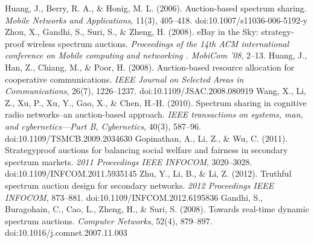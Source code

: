 \begin{thebibliography}{1}
 Huang, J., Berry, R. A., \& Honig, M. L. (2006). Auction-based spectrum sharing. \textit{Mobile Networks and Applications}, 11(3), 405–418. doi:10.1007/s11036-006-5192-y
 Zhou, X., Gandhi, S., Suri, S., \& Zheng, H. (2008). eBay in the Sky: strategy-proof wireless spectrum auctions. \textit{Proceedings of the 14th ACM international conference on Mobile computing and networking . MobiCom  ’08}, 2–13.  
 Huang, J., Han, Z., Chiang, M., \& Poor, H. (2008). Auction-based resource allocation for cooperative communications. \textit{IEEE Journal on Selected Areas in Communications}, 26(7), 1226–1237. doi:10.1109/JSAC.2008.080919
 Wang, X., Li, Z., Xu, P., Xu, Y., Gao, X., \& Chen, H.-H. (2010). Spectrum sharing in cognitive radio networks--an auction-based approach. \textit{IEEE transactions on systems, man, and cybernetics—Part B, Cybernetics}, 40(3), 587–96. doi:10.1109/TSMCB.2009.2034630
 Gopinathan, A., Li, Z., \& Wu, C. (2011). Strategyproof auctions for balancing social welfare and fairness in secondary spectrum markets. \textit{2011 Proceedings IEEE INFOCOM}, 3020–3028. doi:10.1109/INFCOM.2011.5935145
 Zhu, Y., Li, B., \& Li, Z. (2012). Truthful spectrum auction design for secondary networks. \textit{2012 Proceedings IEEE INFOCOM}, 873–881. doi:10.1109/INFCOM.2012.6195836
 Gandhi, S., Buragohain, C., Cao, L., Zheng, H., \& Suri, S. (2008). Towards real-time dynamic spectrum auctions. \textit{Computer Networks}, 52(4), 879–897. doi:10.1016/j.comnet.2007.11.003


\end{thebibliography}
